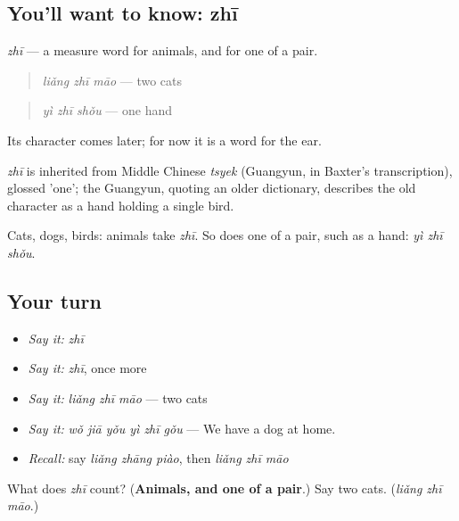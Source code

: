 \subsection*{You'll want to know: zhī}
\emph{zhī} — a measure word for animals, and for one of a pair.

\begin{quote}
\emph{liǎng zhī māo} — two cats
\end{quote}

\begin{quote}
\emph{yì zhī shǒu} — one hand
\end{quote}

Its character comes later; for now it is a word for the ear.

\begin{cousinweb}
\emph{zhī} is inherited from Middle Chinese \emph{tsyek} (Guangyun, in Baxter's transcription), glossed 'one'; the Guangyun, quoting an older dictionary, describes the old character as a hand holding a single bird.
\end{cousinweb}

\begin{grammarlens}[title={What you've built}]
Cats, dogs, birds: animals take \emph{zhī}. So does one of a pair, such as a hand: \emph{yì zhī shǒu}.
\end{grammarlens}

\subsection*{Your turn}
\begin{itemize}
\raggedright
  \item \emph{Say it:} \emph{zhī}
  \item \emph{Say it:} \emph{zhī}, once more
  \item \emph{Say it:} \emph{liǎng zhī māo} — two cats
  \item \emph{Say it:} \emph{wǒ jiā yǒu yì zhī gǒu} — We have a dog at home.
  \item \emph{Recall:} say \emph{liǎng zhāng piào}, then \emph{liǎng zhī māo}
\end{itemize}

\begin{tcolorbox}[breakable,colback=teal!4,colframe=teal!35!black,title={Before you move on}]
What does \emph{zhī} count? (\textbf{Animals, and one of a pair}.) Say two cats. (\emph{liǎng zhī māo}.)
\end{tcolorbox}
\section[Practice]{}

